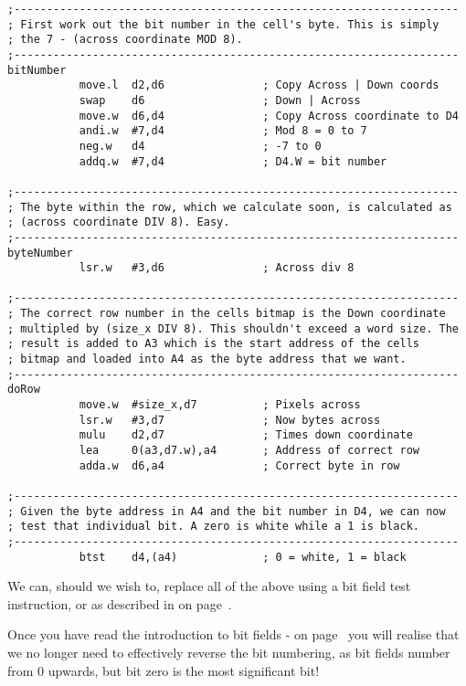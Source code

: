 \begin{lstlisting}[firstnumber=255,caption={Langtons Ant - Existing Bitmap Calculation}]
;--------------------------------------------------------------------
; First work out the bit number in the cell's byte. This is simply
; the 7 - (across coordinate MOD 8).
;--------------------------------------------------------------------
bitNumber
           move.l  d2,d6               ; Copy Across | Down coords
           swap    d6                  ; Down | Across
           move.w  d6,d4               ; Copy Across coordinate to D4
           andi.w  #7,d4               ; Mod 8 = 0 to 7
           neg.w   d4                  ; -7 to 0
           addq.w  #7,d4               ; D4.W = bit number

;--------------------------------------------------------------------
; The byte within the row, which we calculate soon, is calculated as
; (across coordinate DIV 8). Easy.
;--------------------------------------------------------------------
byteNumber
           lsr.w   #3,d6               ; Across div 8

;--------------------------------------------------------------------
; The correct row number in the cells bitmap is the Down coordinate
; multipled by (size_x DIV 8). This shouldn't exceed a word size. The
; result is added to A3 which is the start address of the cells
; bitmap and loaded into A4 as the byte address that we want.
;--------------------------------------------------------------------
doRow
           move.w  #size_x,d7          ; Pixels across
           lsr.w   #3,d7               ; Now bytes across
           mulu    d2,d7               ; Times down coordinate
           lea     0(a3,d7.w),a4       ; Address of correct row
           adda.w  d6,a4               ; Correct byte in row

;--------------------------------------------------------------------
; Given the byte address in A4 and the bit number in D4, we can now
; test that individual bit. A zero is white while a 1 is black.
;--------------------------------------------------------------------
           btst    d4,(a4)             ; 0 = white, 1 = black
\end{lstlisting}

We can, should we wish to, replace all of the above using a bit field test instruction, or  as described in  on page~\pageref{chp-mc68020-bftst}.

Once you have read the introduction to bit fields -  on page~\pageref{chp-mc68020-bitfields} you will realise that we no longer need to effectively reverse the bit numbering, as bit fields number from 0 upwards, but bit zero is the most significant bit!

